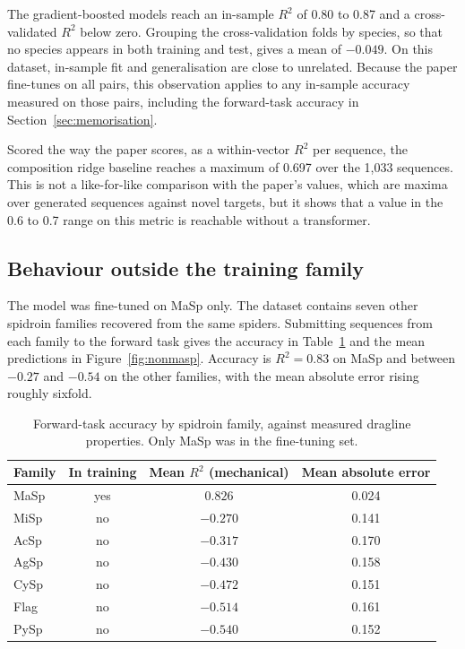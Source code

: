 \documentclass[11pt,a4paper]{article}
\begin{document}
The gradient-boosted models reach an in-sample $R^2$ of 0.80 to 0.87 and a
cross-validated $R^2$ below zero. Grouping the cross-validation folds by species,
so that no species appears in both training and test, gives a mean of $-0.049$.
On this dataset, in-sample fit and generalisation are close to unrelated. Because
the paper fine-tunes on all pairs, this observation applies to any in-sample
accuracy measured on those pairs, including the forward-task accuracy in
Section~\ref{sec:memorisation}.

Scored the way the paper scores, as a within-vector $R^2$ per sequence, the
composition ridge baseline reaches a maximum of 0.697 over the 1{,}033 sequences.
This is not a like-for-like comparison with the paper's values, which are maxima
over generated sequences against novel targets, but it shows that a value in the
0.6 to 0.7 range on this metric is reachable without a transformer.

\subsection{Behaviour outside the training family}
\label{sec:nonmasp}

The model was fine-tuned on MaSp only. The dataset contains seven other spidroin
families recovered from the same spiders. Submitting sequences from each family
to the forward task gives the accuracy in Table~\ref{tab:nonmasp} and the mean
predictions in Figure~\ref{fig:nonmasp}. Accuracy is $R^2 = 0.83$ on MaSp and
between $-0.27$ and $-0.54$ on the other families, with the mean absolute error
rising roughly sixfold.

\begin{table}[htbp]
\centering
\small
\caption{Forward-task accuracy by spidroin family, against measured dragline
properties. Only MaSp was in the fine-tuning set.}
\label{tab:nonmasp}
\begin{tabular}{lccc}
\toprule
Family & In training & Mean $R^2$ (mechanical) & Mean absolute error \\
\midrule
MaSp & yes & $0.826$ & 0.024 \\
MiSp & no & $-0.270$ & 0.141 \\
AcSp & no & $-0.317$ & 0.170 \\
AgSp & no & $-0.430$ & 0.158 \\
CySp & no & $-0.472$ & 0.151 \\
Flag & no & $-0.514$ & 0.161 \\
PySp & no & $-0.540$ & 0.152 \\
\bottomrule
\end{tabular}
\end{table}
\end{document}
